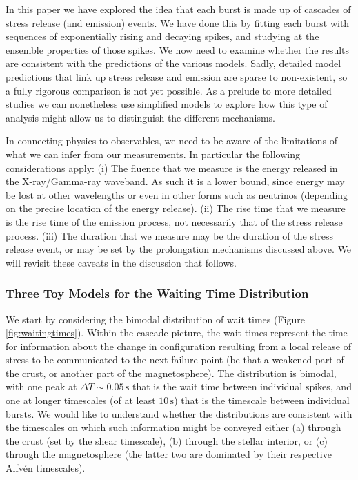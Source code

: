 \documentclass[12pt]{emulateapj}
\begin{document}
In this paper we have explored the idea that each burst is made up of cascades of stress release (and emission) events. We have done this by fitting each 
burst with sequences of exponentially rising and decaying spikes, and studying at the ensemble properties of those spikes. We now need to examine whether 
the results are consistent with the predictions of the various models. Sadly, detailed model predictions that link up stress release and emission are sparse to 
non-existent, so a fully rigorous comparison is not yet possible. As a prelude to more detailed studies we can nonetheless use simplified models to explore 
how this type of analysis might allow us to distinguish the different mechanisms.

In connecting physics to observables, we need to be aware of the limitations of what we can infer from our measurements. In particular the following 
considerations apply: (i) The fluence that we measure is the energy released in the X-ray/Gamma-ray waveband. As such it is a lower bound, since 
energy may be lost at other wavelengths or even in other forms such as neutrinos (depending on the precise location of the energy release). (ii) The
 rise time that we measure is the rise time of the emission process, not necessarily that of the stress release process. (iii) The duration that we measure 
 may be the duration of the stress release event, or may be set by the prolongation mechanisms discussed above. We will revisit these caveats in the 
 discussion that follows.

\subsubsection{Three Toy Models for the Waiting Time Distribution}

We start by considering the bimodal distribution of wait times (Figure \ref{fig:waitingtimes}). Within the cascade picture, the wait times represent the 
time for information about the change in configuration resulting from a local release of stress to be communicated to the next failure point (be that a 
weakened part of the crust, or another part of the magnetosphere). The distribution is bimodal, with one peak at $\Delta T\sim 0.05\,\mathrm{s}$ that 
is the wait time between individual spikes, and one at longer timescales (of at least $10\,\mathrm{s}$) that is the timescale between individual bursts. 
We would like to understand whether the distributions are consistent with the timescales on which such information might be conveyed either (a) through 
the crust (set by the shear timescale), (b) through the stellar interior, or (c) through the magnetosphere (the latter two are dominated by their respective Alfv\'en timescales).
\end{document}
